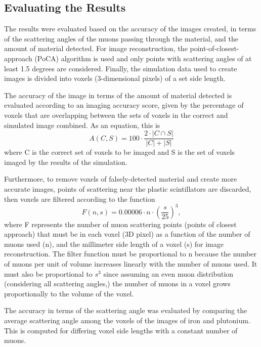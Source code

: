 \documentclass[10pt,a4paper]{article}
\begin{document}
\subsection{Evaluating the Results}
    The results were evaluated based on the accuracy of the images created, in terms of the scattering angles of the muons passing through the material, and the amount of material detected. For image reconstruction, the point-of-closest-approach (PoCA) algorithm is used and only points with scattering angles of at least 1.5 degrees are considered. Finally, the simulation data used to create images is divided into voxels (3-dimensional pixels) of a set side length.

    The accuracy of the image in terms of the amount of material detected is evaluated according to an imaging accuracy score, given by the percentage of voxels that are overlapping between the sets of voxels in the correct and simulated image combined. As an equation, this is
    \begin{equation}
        A(C, S) = 100 \cdot \frac{2 \cdot |C \cap S|}{|C| + |S|}
    \end{equation}
    where C is the correct set of voxels to be imaged and S is the set of voxels imaged by the results of the simulation.

    Furthermore, to remove voxels of falsely-detected material and create more accurate images, points of scattering near the plastic scintillators are discarded, then voxels are filtered according to the function
    \begin{equation}
        F(n, s) = 0.00006 \cdot n \cdot \left(\frac{s}{25}\right)^3, 
    \end{equation} 
    where F represents the number of muon scattering points (points of closest approach) that must be in each voxel (3D pixel) as a function of the number of muons used (n), and the millimeter side length of a voxel (s) for image reconstruction. The filter function must be proportional to n because the number of muons per unit of volume increases linearly with the number of muons used. It must also be proportional to $s^3$ since assuming an even muon distribution (considering all scattering angles,) the number of muons in a voxel grows proportionally to the volume of the voxel.

    The accuracy in terms of the scattering angle was evaluated by comparing the average scattering angle among the voxels of the images of iron and plutonium. This is computed for differing voxel side lengths with a constant number of muons.
\end{document}
